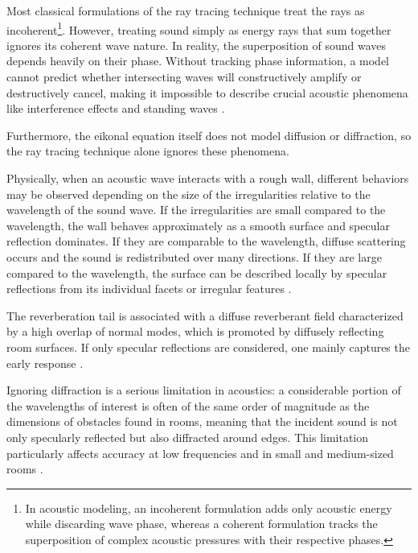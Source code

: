 \documentclass{Configuration_Files/PoliMi3i_thesis}
\newif\ifshowthesischanges
\DeclareRobustCommand{\thesischange}[2]{%
    \ifshowthesischanges
        \textcolor{#1}{#2}%
    \else
        #2%
    \fi
}
\def\thesischange#1#2{#2}%
\begin{document}
Most classical formulations of the ray tracing technique treat the rays as incoherent\footnote{\thesischange{red}{In acoustic modeling, an incoherent formulation adds only acoustic energy while discarding wave phase, whereas a coherent formulation tracks the superposition of complex acoustic pressures with their respective phases.}}. However, treating sound simply as energy rays that sum together ignores its coherent wave nature. In reality, the superposition of sound waves depends heavily on their phase. Without tracking phase information, a model cannot predict whether intersecting waves will constructively amplify or destructively cancel, making it impossible to describe crucial acoustic phenomena like interference effects and standing waves \citep{funkhouser_beam_1998,kuttruff_acoustics_2007,kuttruff_room_2009}.

Furthermore, the eikonal equation itself does not model diffusion or diffraction, so the ray tracing technique alone ignores these phenomena.

Physically, when an acoustic wave interacts with a rough wall, different behaviors may be observed depending on the size of the irregularities relative to the wavelength of the sound wave. If the irregularities are small compared to the wavelength, the wall behaves approximately as a smooth surface and specular reflection dominates. If they are comparable to the wavelength, diffuse scattering occurs and the sound is redistributed over many directions. If they are large compared to the wavelength, the surface can be described locally by specular reflections from its individual facets or irregular features \citep{kuttruff_acoustics_2007}.

The reverberation tail is associated with a diffuse reverberant field characterized by a high overlap of normal modes, which is promoted by diffusely reflecting room surfaces. If only specular reflections are considered, one mainly captures the early response \citep{kuttruff_room_2009}.

Ignoring diffraction is a serious limitation in acoustics: a considerable portion of the wavelengths of interest is often of the same order of magnitude as the dimensions of obstacles found in rooms, meaning that the incident sound is not only specularly reflected but also diffracted around edges. This limitation particularly affects accuracy at low frequencies and in small and medium-sized rooms \citep{funkhouser_beam_1998,kuttruff_acoustics_2007,kuttruff_room_2009,pind_acoustic_2018}.
\end{document}
